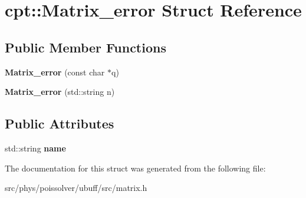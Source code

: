 \hypertarget{structcpt_1_1Matrix__error}{}\section{cpt\+:\+:Matrix\+\_\+error Struct Reference}
\label{structcpt_1_1Matrix__error}
\subsection*{Public Member Functions}
\begin{DoxyCompactItemize}
\item 
{\bfseries Matrix\+\_\+error} (const char $\ast$q)\hypertarget{structcpt_1_1Matrix__error_a0e993c31037a012acbe606a789454b99}{}\label{structcpt_1_1Matrix__error_a0e993c31037a012acbe606a789454b99}

\item 
{\bfseries Matrix\+\_\+error} (std\+::string n)\hypertarget{structcpt_1_1Matrix__error_a528bc9ddf5368f975b1e508e6753a847}{}\label{structcpt_1_1Matrix__error_a528bc9ddf5368f975b1e508e6753a847}

\end{DoxyCompactItemize}
\subsection*{Public Attributes}
\begin{DoxyCompactItemize}
\item 
std\+::string {\bfseries name}\hypertarget{structcpt_1_1Matrix__error_a3411642ea84db873843d013ea3ffb9ee}{}\label{structcpt_1_1Matrix__error_a3411642ea84db873843d013ea3ffb9ee}

\end{DoxyCompactItemize}


The documentation for this struct was generated from the following file\+:\begin{DoxyCompactItemize}
\item 
src/phys/poissolver/ubuff/src/matrix.\+h\end{DoxyCompactItemize}

